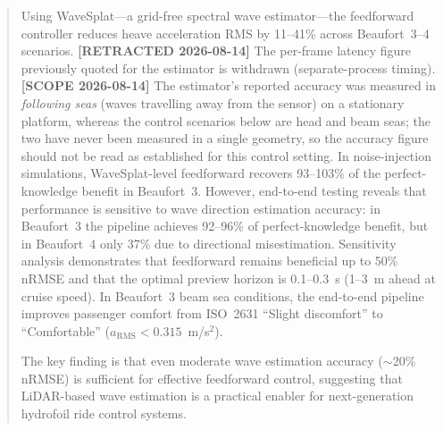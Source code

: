 \documentclass[review]{elsarticle}
\begin{document}
\begin{frontmatter}
\begin{abstract}
Using WaveSplat---a grid-free spectral wave estimator---the feedforward
controller reduces heave acceleration RMS by 11--41\% across
Beaufort~3--4 scenarios.
\textbf{[RETRACTED 2026-08-14]} The per-frame latency figure previously quoted
for the estimator is withdrawn (separate-process timing).
\textbf{[SCOPE 2026-08-14]} The estimator's reported accuracy was measured in
\emph{following seas} (waves travelling away from the sensor) on a stationary
platform, whereas the control scenarios below are head and beam seas;
the two have never been measured in a single geometry, so the accuracy figure
should not be read as established for this control setting.
In noise-injection simulations, WaveSplat-level feedforward recovers
93--103\% of the perfect-knowledge benefit in Beaufort~3.
However, end-to-end testing reveals that performance is sensitive to
wave direction estimation accuracy: in Beaufort~3 the pipeline achieves
92--96\% of perfect-knowledge benefit, but in Beaufort~4 only 37\%
due to directional misestimation.
Sensitivity analysis demonstrates that feedforward remains beneficial
up to 50\% nRMSE and that the optimal preview horizon is 0.1--0.3~s
(1--3~m ahead at cruise speed).
In Beaufort~3 beam sea conditions, the end-to-end pipeline improves
passenger comfort from ISO~2631 ``Slight discomfort'' to
``Comfortable'' ($a_\text{RMS} < 0.315$~m/s$^2$).

The key finding is that even moderate wave estimation accuracy
($\sim$20\% nRMSE) is sufficient for effective feedforward control,
suggesting that LiDAR-based wave estimation is a practical enabler for
next-generation hydrofoil ride control systems.
\end{abstract}


\end{frontmatter}
\end{document}
